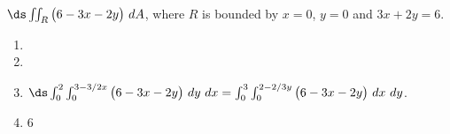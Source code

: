 {$\ds \iint_R \big(6-3x-2y\big)\ dA$, where $R$ is bounded by $x=0$, $y=0$ and $3x+2y=6$. 
}
{\begin{enumerate}
\item \noindent \begin{minipage}{.9\linewidth}
\end{minipage}
\item	
\item $\ds \int_{0}^2\int_{0}^{3-3/2x}\big(6-3x-2y\big)\ dy\ dx = \int_{0}^3\int_{0}^{2-2/3y}\big(6-3x-2y\big)\ dx\ dy$.
\item 6
\end{enumerate}
}